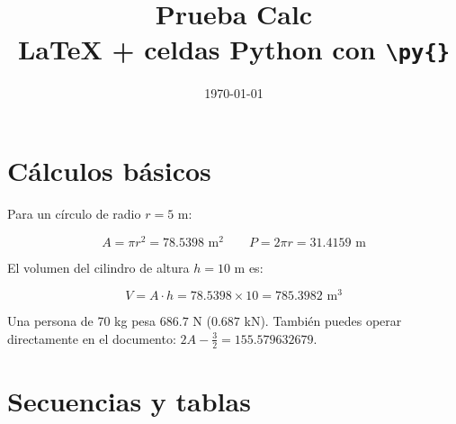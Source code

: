 \documentclass[12pt, a4paper]{article}
\title{\textbf{Prueba Calc}\\[0.5em]
\large LaTeX + celdas Python con \texttt{\textbackslash py\{\}}}
\author{}
\date{\today}
\begin{document}
\maketitle
\tableofcontents
\newpage

\section{Cálculos básicos}

%
%
%

Para un círculo de radio $r = 5$ m:

\[
  A = \pi r^2 = 78.5398 \text{ m}^2
  \qquad
  P = 2\pi r = 31.4159 \text{ m}
\]

El volumen del cilindro de altura $h = 10$ m es:

\[
  V = A \cdot h = 78.5398 \times 10
    = 785.3982 \text{ m}^3
\]

Una persona de 70 kg pesa $686.7$ N
($0.687$ kN). También puedes operar directamente
en el documento: $2A - \tfrac{3}{2} = 155.579632679$.


\section{Secuencias y tablas}

%
%
%
\end{document}
